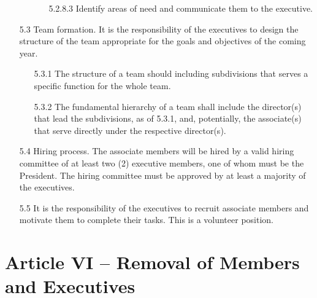 \documentclass[12pt,a4paper]{article}
\begin{document}
\begin{enumerate}
\begin{enumerate}
\begin{enumerate}
\item[5.2.8.3] Identify areas of need and communicate them to the executive.
\end{enumerate}
\end{enumerate}

\item[5.3] Team formation. It is the responsibility of the executives to design the structure of the team appropriate for the goals and objectives of the coming year.

\begin{enumerate}
\item[5.3.1] The structure of a team should including subdivisions that serves a specific function for the whole team.

\item[5.3.2] The fundamental hierarchy of a team shall include the director(s) that lead the subdivisions, as of 5.3.1, and, potentially, the associate(s) that serve directly under the respective director(s).
\end{enumerate}

\item[5.4] Hiring process. The associate members will be hired by a valid hiring committee of at least two (2) executive members, one of whom must be the President. The hiring committee must be approved by at least a majority of the executives.

\item[5.5] It is the responsibility of the executives to recruit associate members and motivate them to complete their tasks. This is a volunteer position.
\end{enumerate}

\section*{Article VI – Removal of Members and Executives}
\end{document}
